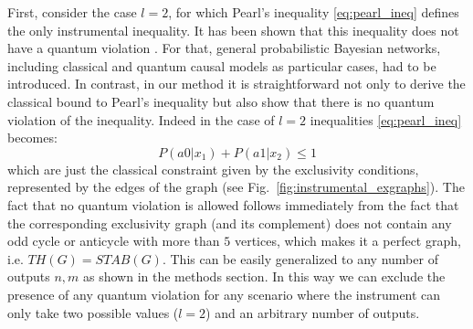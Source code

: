 \documentclass[letterpaper]{article}
\begin{document}
First, consider the case $l=2$, for which Pearl's inequality
\eqref{eq:pearl_ineq} defines the only instrumental inequality. It has been
shown that this inequality does not have a quantum violation \cite{henson2014}.
For that, general probabilistic Bayesian networks, including classical and
quantum causal models as particular cases, had to be introduced.
In contrast, in our method it is straightforward not only to derive the
classical bound to Pearl's inequality but also show that there is no quantum
violation of the inequality. 
Indeed in the case of $l=2$ inequalities \eqref{eq:pearl_ineq} becomes:
\begin{equation}
    P(a0|x_1) + P(a1|x_2) \le 1 
    \label{eq:pearl_ineq_222}
\end{equation}
which are just the classical constraint given by the exclusivity conditions,
represented by the edges of the graph (see Fig.~\ref{fig:instrumental_exgraphs}).
The fact that no quantum violation is allowed follows immediately from the fact
that the corresponding  exclusivity graph (and its complement) does not contain
any odd cycle or anticycle with more than $5$ vertices, which makes it a perfect
graph, i.e. $TH(G) = STAB(G)$. This can be easily generalized to any number of
outputs $n,m$ as shown in the methods section. In this way we can exclude the
presence of any quantum violation for any scenario where the instrument can only
take two possible values ($l=2$) and an arbitrary number of outputs.
\end{document}
